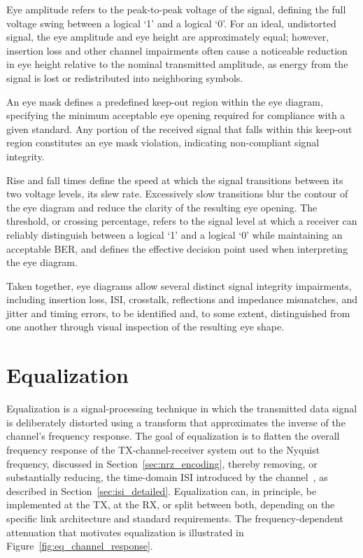 Eye amplitude refers to the peak-to-peak voltage of the signal, defining the full voltage swing between a logical `1' and a logical `0'. For an ideal, undistorted signal, the eye amplitude and eye height are approximately equal; however, insertion loss and other channel impairments often cause a noticeable reduction in eye height relative to the nominal transmitted amplitude, as energy from the signal is lost or redistributed into neighboring symbols.

An eye mask defines a predefined keep-out region within the eye diagram, specifying the minimum acceptable eye opening required for compliance with a given standard. Any portion of the received signal that falls within this keep-out region constitutes an eye mask violation, indicating non-compliant signal integrity.

Rise and fall times define the speed at which the signal transitions between its two voltage levels, its slew rate. Excessively slow transitions blur the contour of the eye diagram and reduce the clarity of the resulting eye opening. The threshold, or crossing percentage, refers to the signal level at which a receiver can reliably distinguish between a logical `1' and a logical `0' while maintaining an acceptable \ac{BER}, and defines the effective decision point used when interpreting the eye diagram.

Taken together, eye diagrams allow several distinct signal integrity impairments, including insertion loss, \ac{ISI}, crosstalk, reflections and impedance mismatches, and jitter and timing errors, to be identified and, to some extent, distinguished from one another through visual inspection of the resulting eye shape.
    
\section{Equalization}\label{sec:equalization}
    
Equalization is a signal-processing technique in which the transmitted data signal is deliberately distorted using a transform that approximates the inverse of the channel's frequency response. The goal of equalization is to flatten the overall frequency response of the \ac{TX}-channel-receiver system out to the Nyquist frequency, discussed in Section~\ref{sec:nrz_encoding}, thereby removing, or substantially reducing, the time-domain \ac{ISI} introduced by the channel~\cite{zamir2018_nrz_pam4,sredojevic_jssc_2011}, as described in Section~\ref{sec:isi_detailed}. Equalization can, in principle, be implemented at the \ac{TX}, at the \ac{RX}, or split between both, depending on the specific link architecture and standard requirements.
The frequency-dependent attenuation that motivates equalization is illustrated in Figure~\ref{fig:eq_channel_response}.

